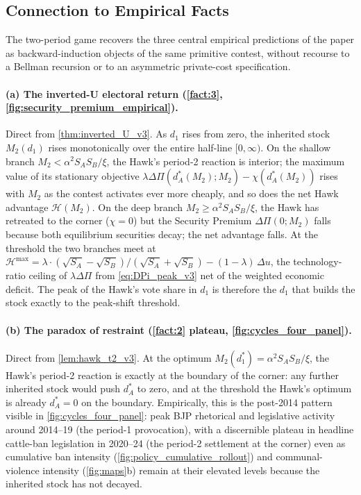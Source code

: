 \documentclass[11pt,twoside]{extarticle}
\begin{document}
\subsection{Connection to Empirical Facts}\label{subsec:recovery_v3}

The two-period game recovers the three central empirical predictions of the paper as backward-induction objects of the same primitive contest, without recourse to a Bellman recursion or to an asymmetric private-cost specification.

\paragraph{(a) The inverted-U electoral return (\autoref{fact:3}, \autoref{fig:security_premium_empirical}).} Direct from \autoref{thm:inverted_U_v3}. As $d_1$ rises from zero, the inherited stock $M_2(d_1)$ rises monotonically over the entire half-line $[0,\infty)$. On the shallow branch $M_2<\alpha^2 S_A S_B/\xi$, the Hawk's period-2 reaction is interior; the maximum value of its stationary objective $\lambda\Delta\Pi(d_A^*(M_2);M_2)-\chi(d_A^*(M_2))$ rises with $M_2$ as the contest activates ever more cheaply, and so does the net Hawk advantage $\mathcal H(M_2)$. On the deep branch $M_2\ge\alpha^2 S_A S_B/\xi$, the Hawk has retreated to the corner ($\chi=0$) but the Security Premium $\Delta\Pi(0;M_2)$ falls because both equilibrium securities decay; the net advantage falls. At the threshold the two branches meet at $\mathcal H^{\max}=\lambda\cdot(\sqrt{S_A}-\sqrt{S_B})/(\sqrt{S_A}+\sqrt{S_B})-(1-\lambda)\,\Delta u$, the technology-ratio ceiling of $\lambda\Delta\Pi$ from \autoref{eq:DPi_peak_v3} net of the weighted economic deficit. The peak of the Hawk's vote share in $d_1$ is therefore the $d_1$ that builds the stock exactly to the peak-shift threshold.

\paragraph{(b) The paradox of restraint (\autoref{fact:2} plateau, \autoref{fig:cycles_four_panel}).} Direct from \autoref{lem:hawk_t2_v3}. At the optimum $M_2(d_1^*)=\alpha^2 S_A S_B/\xi$, the Hawk's period-2 reaction is exactly at the boundary of the corner: any further inherited stock would push $d_A^*$ to zero, and at the threshold the Hawk's optimum is already $d_A^*=0$ on the boundary. Empirically, this is the post-2014 pattern visible in \autoref{fig:cycles_four_panel}: peak BJP rhetorical and legislative activity around 2014--19 (the period-1 provocation), with a discernible plateau in headline cattle-ban legislation in 2020--24 (the period-2 settlement at the corner) even as cumulative ban intensity (\autoref{fig:policy_cumulative_rollout}) and communal-violence intensity (\autoref{fig:maps}b) remain at their elevated levels because the inherited stock has not decayed.
\end{document}
